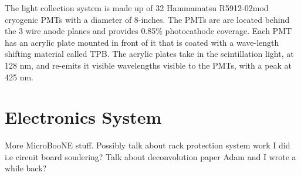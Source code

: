 The light collection system is made up of 32 Hammamatsu R5912-02mod cryogenic PMTs with a diameter of 8-inches. The PMTs are are located behind the 3 wire anode planes and provides 0.85\% photocathode coverage. Each PMT has an acrylic plate mounted in front of it that is coated with a wave-length shifting material called TPB. The acrylic plates take in the scintillation light, at 128 nm, and re-emits it visible wavelengths visible to the PMTs, with a peak at 425 nm. 
\section{Electronics System} 
More MicroBooNE stuff. Possibly talk about rack protection system work I did i.e circuit board soudering? Talk about deconvolution paper Adam and I wrote a while back?
